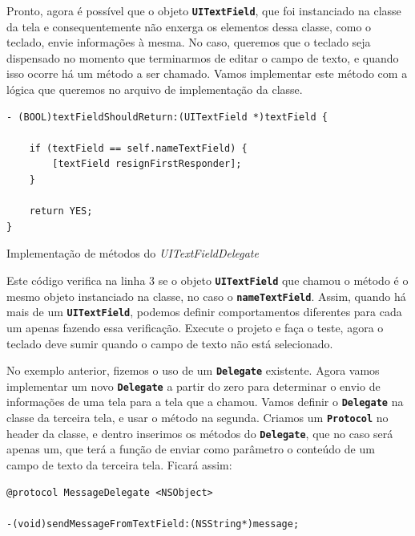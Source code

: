\documentclass[a4paper,12pt,brazil,doubleside]{book}
\begin{document}
\begin{singlespace}
Pronto, agora é possível que o objeto \texttt{\textbf{UITextField}}, que foi instanciado na classe da tela e consequentemente não enxerga os elementos dessa classe, como o teclado, envie informações à mesma. No caso, queremos que o teclado seja dispensado no momento que terminarmos de editar o campo de texto, e quando isso ocorre há um método a ser chamado. Vamos implementar este método com a lógica que queremos no arquivo de implementação da classe.

\begin{listing}[H]
\begin{verbatim}
- (BOOL)textFieldShouldReturn:(UITextField *)textField {
    
    if (textField == self.nameTextField) {
        [textField resignFirstResponder];
    }
    
    return YES;
}
\end{verbatim}
\caption{Implementação de métodos do \emph{UITextFieldDelegate}}
\end{listing}


Este código verifica na linha 3 se o objeto \texttt{\textbf{UITextField}} que chamou o método é o mesmo objeto instanciado na classe, no caso o \texttt{\textbf{nameTextField}}. Assim, quando há mais de um \texttt{\textbf{UITextField}}, podemos definir comportamentos diferentes para cada um apenas fazendo essa verificação. Execute o projeto e faça o teste, agora o teclado deve sumir quando o campo de texto não está selecionado.

No exemplo anterior, fizemos o uso de um \texttt{\textbf{Delegate}} existente. Agora vamos implementar um novo \texttt{\textbf{Delegate}} a partir do zero para determinar o envio de informações de uma tela para a tela que a chamou. Vamos definir o \texttt{\textbf{Delegate}} na classe da terceira tela, e usar o método na segunda. Criamos um \texttt{\textbf{Protocol}} no header da classe, e dentro inserimos os métodos do \texttt{\textbf{Delegate}}, que no caso será apenas um, que terá a função de enviar como parâmetro o conteúdo de um campo de texto da terceira tela. Ficará assim:

\begin{listing}[H]
\begin{verbatim}
@protocol MessageDelegate <NSObject>

-(void)sendMessageFromTextField:(NSString*)message;


\end{verbatim}
\end{listing}
\end{singlespace}
\end{document}
